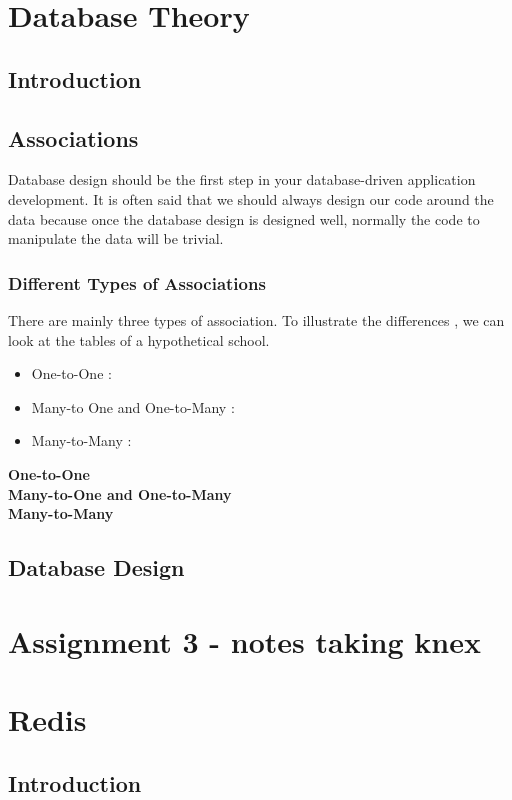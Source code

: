 \documentclass[a4paper]{article}
\begin{document}
\section{Database Theory}
\subsection{Introduction}
\subsection{Associations}
Database design should be the first step in your database-driven application development. It is often said that we should always design our code around the data because once the database design is designed well, normally the code to manipulate the data will be trivial.
\subsubsection{Different Types of Associations}
There are mainly three types of association. To illustrate the differences , we can look at the tables of a hypothetical school.\\
\begin{itemize}
\item One-to-One : 
\item Many-to One and One-to-Many : 
\item Many-to-Many : 
\end{itemize}

\textbf{One-to-One}\\

\textbf{Many-to-One and One-to-Many}\\

\textbf{Many-to-Many}\\


\subsection{Database Design}



\section{Assignment 3 - notes taking knex}

\section{Redis}
\subsection{Introduction}
\end{document}
